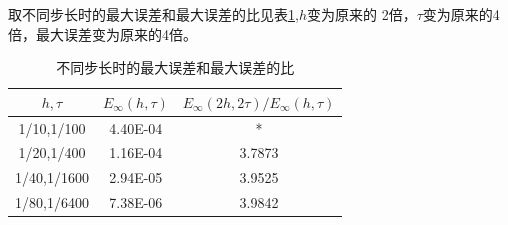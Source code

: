 \documentclass[withoutpreface,bwprint]{cumcmthesis} %
\begin{document}
	取不同步长时的最大误差和最大误差的比见表\ref{tab:2},$h$变为原来的
	2倍，$\tau$变为原来的4倍，最大误差变为原来的4倍。
	\begin{table}[htbp]
		\centering
		\caption{不同步长时的最大误差和最大误差的比}
		\begin{tabular}{ccc}
			\toprule[1.5pt]
			$h,\tau$   & $E_{\infty}(h,\tau)$ & $E_{\infty}(2h,2\tau)/E_{\infty}(h,\tau)$ \\
			\midrule[1pt]
			1/10,1/100 & 4.40E-04 & * \\
			1/20,1/400 & 1.16E-04 & 3.7873  \\
			1/40,1/1600 & 2.94E-05 & 3.9525  \\
			1/80,1/6400 & 7.38E-06 & 3.9842  \\
			\bottomrule[1.5pt]
		\end{tabular}%
		\label{tab:2}%
	\end{table}%
	
\end{document}
